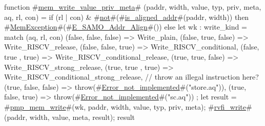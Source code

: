 function #\hyperref[sailRISCVzmemzywritezyvaluezyprivzymeta]{mem\_write\_value\_priv\_meta}# (paddr, width, value, typ, priv, meta, aq, rl, con) = {
  if (rl | con) & #\hyperref[sailRISCVznot]{not}#(#\hyperref[sailRISCVziszyalignedzyaddr]{is\_aligned\_addr}#(paddr, width))
  then #\hyperref[sailRISCVzMemException]{MemException}#(#\hyperref[sailRISCVzEzySAMOzyAddrzyAlign]{E\_SAMO\_Addr\_Align}#())
  else {
    let wk : write_kind = match (aq, rl, con) {
      (false, false, false) => Write_plain,
      (false, true,  false) => Write_RISCV_release,
      (false, false, true)  => Write_RISCV_conditional,
      (false, true , true)  => Write_RISCV_conditional_release,
      (true,  true,  false) => Write_RISCV_strong_release,
      (true,  true , true)  => Write_RISCV_conditional_strong_release,
      // throw an illegal instruction here?
      (true,  false, false) => throw(#\hyperref[sailRISCVzErrorzynotzyimplemented]{Error\_not\_implemented}#("store.aq")),
      (true,  false, true)  => throw(#\hyperref[sailRISCVzErrorzynotzyimplemented]{Error\_not\_implemented}#("sc.aq"))
    };
    let result = #\hyperref[sailRISCVzpmpzymemzywrite]{pmp\_mem\_write}#(wk, paddr, width, value, typ, priv, meta);
    #\hyperref[sailRISCVzrvfizywrite]{rvfi\_write}#(paddr, width, value, meta, result);
    result
  }
}
